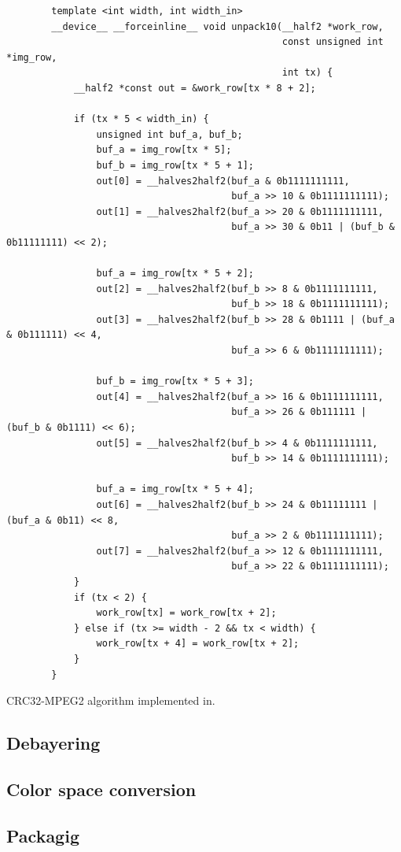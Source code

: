 \begin{listing}[H]
    \begin{verbatim}
        template <int width, int width_in>
        __device__ __forceinline__ void unpack10(__half2 *work_row, 
                                                 const unsigned int *img_row,
                                                 int tx) {
            __half2 *const out = &work_row[tx * 8 + 2];
        
            if (tx * 5 < width_in) {
                unsigned int buf_a, buf_b;
                buf_a = img_row[tx * 5];
                buf_b = img_row[tx * 5 + 1];
                out[0] = __halves2half2(buf_a & 0b1111111111, 
                                        buf_a >> 10 & 0b1111111111);
                out[1] = __halves2half2(buf_a >> 20 & 0b1111111111,
                                        buf_a >> 30 & 0b11 | (buf_b & 0b11111111) << 2);
        
                buf_a = img_row[tx * 5 + 2];
                out[2] = __halves2half2(buf_b >> 8 & 0b1111111111, 
                                        buf_b >> 18 & 0b1111111111);
                out[3] = __halves2half2(buf_b >> 28 & 0b1111 | (buf_a & 0b111111) << 4,
                                        buf_a >> 6 & 0b1111111111);

                buf_b = img_row[tx * 5 + 3];
                out[4] = __halves2half2(buf_a >> 16 & 0b1111111111,
                                        buf_a >> 26 & 0b111111 | (buf_b & 0b1111) << 6);
                out[5] = __halves2half2(buf_b >> 4 & 0b1111111111, 
                                        buf_b >> 14 & 0b1111111111);
        
                buf_a = img_row[tx * 5 + 4];
                out[6] = __halves2half2(buf_b >> 24 & 0b11111111 | (buf_a & 0b11) << 8,
                                        buf_a >> 2 & 0b1111111111);
                out[7] = __halves2half2(buf_a >> 12 & 0b1111111111, 
                                        buf_a >> 22 & 0b1111111111);
            }
            if (tx < 2) {
                work_row[tx] = work_row[tx + 2];
            } else if (tx >= width - 2 && tx < width) {
                work_row[tx + 4] = work_row[tx + 2];
            }
        }
    \end{verbatim}
    \caption{CRC32-MPEG2 algorithm implemented in.}

    \subsection{Debayering}

    \subsection{Color space conversion}

    \subsection{Packagig}
\end{listing}